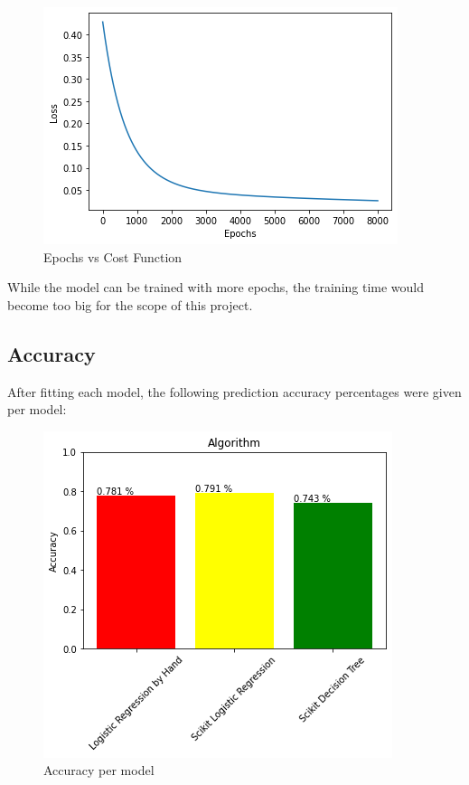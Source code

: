 \documentclass[letterpaper, 10 pt, conference]{ieeeconf}
\begin{document}
\begin{figure}[thpb]
    \centering
    \includegraphics[scale=0.6]{figures/epochs.png}
    \caption{Epochs vs Cost Function}
    \label{epochs}
 \end{figure}


While the model can be trained with more epochs, the training time would become too big for the scope of this project. \\

\subsection{Accuracy}
After fitting each model, the following prediction accuracy percentages were given per model:
\begin{figure}[thpb]
    \centering
    \includegraphics[scale=0.5]{figures/accuracy.png}
    \caption{Accuracy per model}
    \label{accuracy}
 \end{figure}
\end{document}
